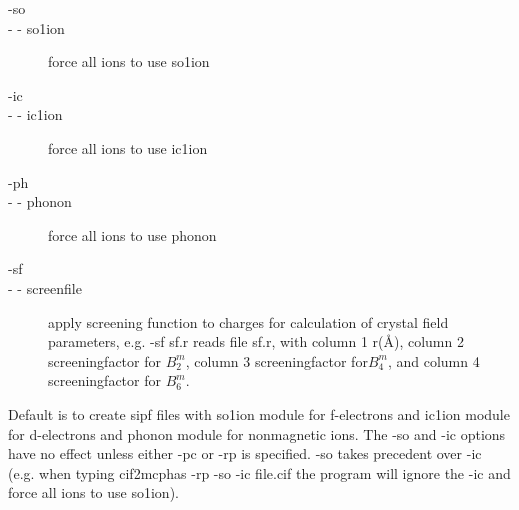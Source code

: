 \begin{description}
\begin{description}
\item[-so       ] \item[- - so1ion]  force all ions to use so1ion
\item[-ic        ]\item[- - ic1ion]  force all ions to use ic1ion
\item[-ph        ] \item[- - phonon] force all ions to use phonon
\item[-sf ]\item[- - screenfile]  apply screening function to charges for calculation of crystal field parameters,
                           e.g. {\prg -sf sf.r} reads file {\prg sf.r}, with column 1 r(\AA),
 column 2  screeningfactor for $B_2^m$, column 3 screeningfactor for$ B_4^m$, and column 4
screeningfactor for $B_6^m$.
\end{description}


Default is to create sipf files with so1ion module for f-electrons and ic1ion module for d-electrons
and phonon module for nonmagnetic ions.
 The {\prg -so} and {\prg -ic} options have no effect unless either {\prg -pc}
 or {\prg -rp} is specified.
{\prg -so} takes precedent over {\prg -ic} (e.g. 
when typing {\prg cif2mcphas -rp -so -ic file.cif} the program will ignore the
{\prg -ic} and force all ions to use so1ion).


\end{description}
